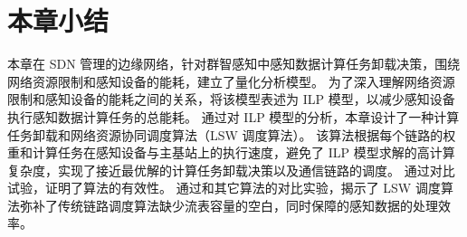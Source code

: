 \section{本章小结}

本章在 SDN 管理的边缘网络，针对群智感知中感知数据计算任务卸载决策，围绕网络资源限制和感知设备的能耗，建立了量化分析模型。
为了深入理解网络资源限制和感知设备的能耗之间的关系，将该模型表述为 ILP 模型，以减少感知设备执行感知数据计算任务的总能耗。
通过对 ILP 模型的分析，本章设计了一种计算任务卸载和网络资源协同调度算法（LSW 调度算法）。
该算法根据每个链路的权重和计算任务在感知设备与主基站上的执行速度，避免了 ILP 模型求解的高计算复杂度，实现了接近最优解的计算任务卸载决策以及通信链路的调度。
通过对比试验，证明了算法的有效性。
通过和其它算法的对比实验，揭示了 LSW 调度算法弥补了传统链路调度算法缺少流表容量的空白，同时保障的感知数据的处理效率。



